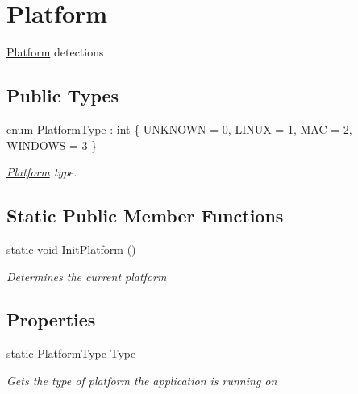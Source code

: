 \hypertarget{classOTA_1_1Misc_1_1Platform}{}\section{Platform}
\label{classOTA_1_1Misc_1_1Platform}


\hyperlink{classOTA_1_1Misc_1_1Platform}{Platform} detections  


\subsection*{Public Types}
\begin{DoxyCompactItemize}
\item 
enum \hyperlink{classOTA_1_1Misc_1_1Platform_a118d12ed2cb6c6d4ebd67a9891b95d5f}{Platform\+Type} \+: int \{ \hyperlink{classOTA_1_1Misc_1_1Platform_a118d12ed2cb6c6d4ebd67a9891b95d5fa696b031073e74bf2cb98e5ef201d4aa3}{U\+N\+K\+N\+O\+W\+N} = 0, 
\hyperlink{classOTA_1_1Misc_1_1Platform_a118d12ed2cb6c6d4ebd67a9891b95d5faee86602a23e7a9a5136f6b2138894aa5}{L\+I\+N\+U\+X} = 1, 
\hyperlink{classOTA_1_1Misc_1_1Platform_a118d12ed2cb6c6d4ebd67a9891b95d5fa2e25c285356cbb0ed8785a1377027d79}{M\+A\+C} = 2, 
\hyperlink{classOTA_1_1Misc_1_1Platform_a118d12ed2cb6c6d4ebd67a9891b95d5fad273a0465c8fbfd111aae706cdf9ec20}{W\+I\+N\+D\+O\+W\+S} = 3
 \}\begin{DoxyCompactList}\small\item\em \hyperlink{classOTA_1_1Misc_1_1Platform}{Platform} type. \end{DoxyCompactList}
\end{DoxyCompactItemize}
\subsection*{Static Public Member Functions}
\begin{DoxyCompactItemize}
\item 
static void \hyperlink{classOTA_1_1Misc_1_1Platform_ac180badc6c8955c7cb429c2bd61dd195}{Init\+Platform} ()
\begin{DoxyCompactList}\small\item\em Determines the current platform \end{DoxyCompactList}\end{DoxyCompactItemize}
\subsection*{Properties}
\begin{DoxyCompactItemize}
\item 
static \hyperlink{classOTA_1_1Misc_1_1Platform_a118d12ed2cb6c6d4ebd67a9891b95d5f}{Platform\+Type} \hyperlink{classOTA_1_1Misc_1_1Platform_ab0abb87615c34b902f551cb0d8772c52}{Type}
\begin{DoxyCompactList}\small\item\em Gets the type of platform the application is running on \end{DoxyCompactList}\end{DoxyCompactItemize}


